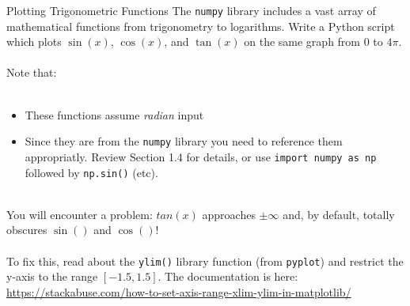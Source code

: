 \documentclass{lab}
\begin{document}
\begin{task}{Plotting Trigonometric Functions}{}
The \texttt{numpy} library includes a vast array of mathematical functions from trigonometry to logarithms. Write a Python script which plots $\sin(x)$, $\cos(x)$, and $\tan(x)$ on the same graph from $0$ to $4\pi$.
\\~\\
Note that:
\\~
\begin{itemize}
\item These functions assume \textit{radian} input
\item Since they are from the \texttt{numpy} library you need to reference them appropriatly. Review Section 1.4 for details, or use \texttt{import numpy as np} followed by \texttt{np.sin()} (etc).
\end{itemize}
~\\
You will encounter a problem: $tan(x)$ approaches $\pm \infty$ and, by default, totally obscures $\sin()$ and $\cos()$!
\\~\\
To fix this, read about the \texttt{ylim()} library function (from \texttt{pyplot}) and restrict the y-axis to the range $[-1.5, 1.5]$. The documentation is here: \url{https://stackabuse.com/how-to-set-axis-range-xlim-ylim-in-matplotlib/}
\end{task}
\pagebreak
\end{document}
